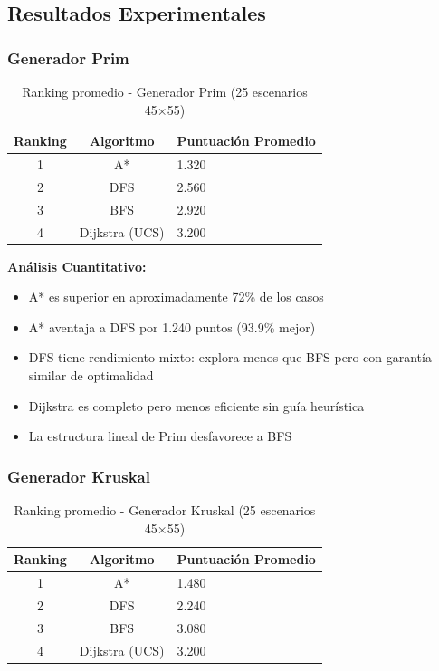 \documentclass[12pt,a4paper]{article}
\begin{document}
\subsection{Resultados Experimentales}

\subsubsection{Generador Prim}

\begin{table}[H]
\centering
\caption{Ranking promedio - Generador Prim (25 escenarios 45×55)}
\begin{tabular}{|c|c|p{6cm}|}
\hline
\textbf{Ranking} & \textbf{Algoritmo} & \textbf{Puntuación Promedio} \\
\hline
1 & A* & 1.320 \\
\hline
2 & DFS & 2.560 \\
\hline
3 & BFS & 2.920 \\
\hline
4 & Dijkstra (UCS) & 3.200 \\
\hline
\end{tabular}
\end{table}

\textbf{Análisis Cuantitativo:}
\begin{itemize}
    \item A* es superior en aproximadamente 72\% de los casos
    \item A* aventaja a DFS por 1.240 puntos (93.9\% mejor)
    \item DFS tiene rendimiento mixto: explora menos que BFS pero con garantía similar de optimalidad
    \item Dijkstra es completo pero menos eficiente sin guía heurística
    \item La estructura lineal de Prim desfavorece a BFS
\end{itemize}

\subsubsection{Generador Kruskal}

\begin{table}[H]
\centering
\caption{Ranking promedio - Generador Kruskal (25 escenarios 45×55)}
\begin{tabular}{|c|c|p{6cm}|}
\hline
\textbf{Ranking} & \textbf{Algoritmo} & \textbf{Puntuación Promedio} \\
\hline
1 & A* & 1.480 \\
\hline
2 & DFS & 2.240 \\
\hline
3 & BFS & 3.080 \\
\hline
4 & Dijkstra (UCS) & 3.200 \\
\hline
\end{tabular}
\end{table}
\end{document}

